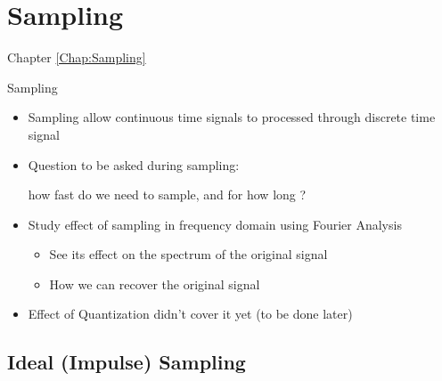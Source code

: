 \section{Sampling}
\label{Chap:Sampling}
\begin{frame}[t]{Chapter \autoref{Chap:Sampling}}
\tableofcontents[sections= \value{section}]
\end{frame}


\begin{frame}[t]{Sampling}

\begin{itemize}

\item Sampling allow continuous time signals to processed through discrete time signal

\item Question to be asked during sampling: 

how fast do we need to sample, and for how long ?

\item Study effect of sampling in frequency domain using Fourier Analysis

	\begin{itemize}
	\item See its effect on the spectrum of the original signal
	
	\item How we can recover the original signal
	\end{itemize}


\item Effect of Quantization didn't cover it yet (to be done later)

\end{itemize}



\end{frame}


\subsection{Ideal (Impulse) Sampling}
\label{Sub:Ideal_Sampling}


